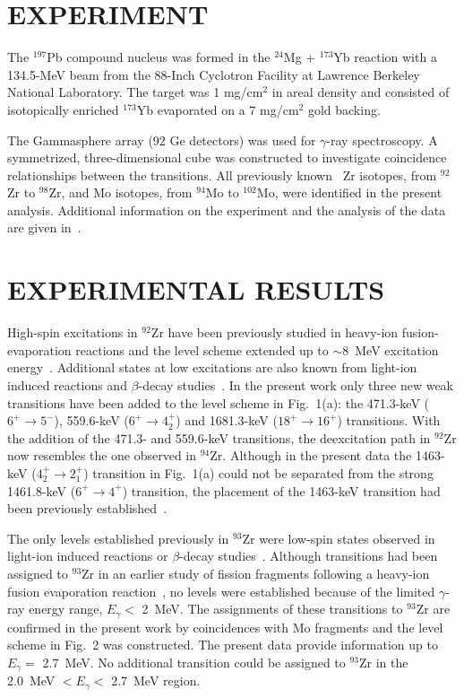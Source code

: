 \section{ EXPERIMENT}

 The $^{197}$Pb compound nucleus was formed in the $^{24}$Mg + $^{173}$Yb
reaction with a 134.5-MeV beam from the 88-Inch Cyclotron Facility at Lawrence
Berkeley National Laboratory. The target was 1 mg/cm$^{2}$ in areal density and
consisted of isotopically enriched $^{173}$Yb evaporated on a 7 mg/cm$^{2}$ gold
backing.

The Gammasphere array (92 Ge detectors) was used for $\gamma$-ray spectroscopy.
A symmetrized, three-dimensional cube was constructed to investigate coincidence
relationships between the transitions. All previously known~\cite{TOI} Zr
isotopes, from $^{92}$Zr to $^{98}$Zr, and Mo isotopes, from $^{94}$Mo to
$^{102}$Mo, were identified in the present analysis. Additional information on
the experiment and the analysis of the data are given in~\cite{Foti}.

\section{ EXPERIMENTAL RESULTS}

High-spin excitations in $^{92}$Zr have been previously studied in heavy-ion
fusion-evaporation reactions and the level scheme extended up to $\sim$8~MeV
excitation energy~\cite{Bro,Kor,NDS2}. Additional states at low excitations
are also known from light-ion induced reactions and $\beta$-decay
studies~\cite{NDS2}. In the present work only three new weak 
transitions have been
added to the level scheme in Fig.~1(a): the 471.3-keV ($6^{+} \rightarrow
5^{-}$), 559.6-keV ($6^{+} \rightarrow 4_{2}^{+}$) and 1681.3-keV ($18^{+}
\rightarrow 16^{+}$) transitions. With the addition of the
471.3- and 559.6-keV transitions, the deexcitation path in $^{92}$Zr now
resembles the one observed in $^{94}$Zr. Although in the present
data the 1463-keV ($4_2^{+} \rightarrow 2_{1}^{+}$) transition in
Fig.~1(a) could not be separated from the strong 1461.8-keV 
($6^{+} \rightarrow 4^{+}$) transition, the placement of the 
1463-keV transition had been previously established~\cite{TOI}.

The only levels established previously in $^{93}$Zr were low-spin states
observed in light-ion induced reactions or $\beta$-decay studies~\cite{NDS3}.
Although transitions had been assigned to $^{93}$Zr in an earlier study of
fission fragments following a heavy-ion fusion evaporation reaction~\cite{Por},
no levels were established because of the limited $\gamma$-ray energy range,
$E_{\gamma} <$ 2~MeV. The assignments of these transitions to $^{93}$Zr are
confirmed in the present work by coincidences with Mo fragments and 
the level scheme in Fig.~2 was
constructed. The present data provide information up to 
$E_{\gamma} =$ 2.7~MeV. No
additional transition could be assigned to $^{93}$Zr in the 
2.0~MeV $< E_{\gamma} <$ 2.7~MeV
region. 

